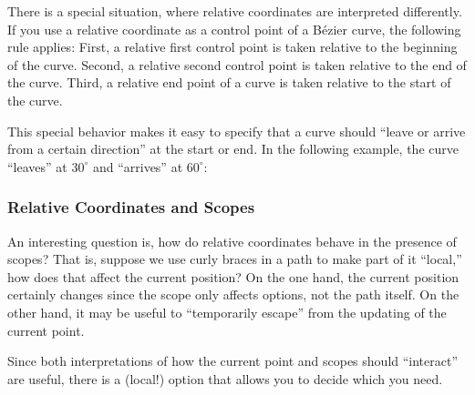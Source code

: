 There is a special situation, where relative coordinates are
interpreted differently. If you use a relative coordinate as a control
point of a B\'ezier curve, the following rule applies: First, a relative
first control point is taken relative to the beginning of the
curve. Second, a relative second control point is taken relative to
the end of the curve. Third, a relative end point of a curve is taken
relative to the start of the curve.

This special behavior makes it easy to specify that a curve should
``leave or arrive from a certain direction'' at the start or end. In
the following example, the curve ``leaves'' at $30^\circ$ and
``arrives'' at $60^\circ$:

\begin{codeexample}[]
\end{codeexample}


\subsubsection{Relative Coordinates and Scopes}
\label{section-scopes-relative}
An interesting question is, how do relative coordinates behave in the
presence of scopes? That is, suppose we use curly braces in a path to
make part of it ``local,'' how does that affect the current position?
On the one hand, the current position certainly changes since the
scope only affects options, not the path itself. On the other hand, it
may be useful to ``temporarily escape'' from the updating of the
current point.

Since both interpretations of how the current point and scopes should
``interact'' are useful, there is a (local!) option that allows you to
decide which you need.

